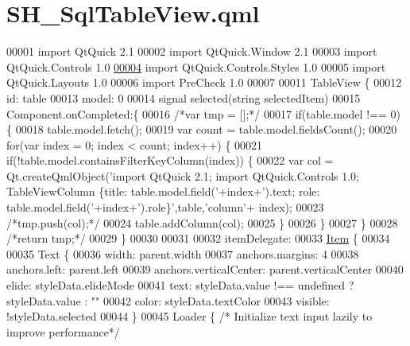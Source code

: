 \hypertarget{SH__SqlTableView_8qml}{\section{S\-H\-\_\-\-Sql\-Table\-View.\-qml}
\label{SH__SqlTableView_8qml}
}

\begin{DoxyCode}
00001 \textcolor{keyword}{import} QtQuick 2.1
00002 import QtQuick.Window 2.1
00003 import QtQuick.Controls 1.0
\hypertarget{SH__SqlTableView_8qml_source_l00004}{}\hyperlink{classSH__SqlTableView}{00004} import QtQuick.Controls.Styles 1.0
00005 import QtQuick.Layouts 1.0
00006 import PreCheck 1.0
00007 
00011 TableView \{
00012     \textcolor{keywordtype}{id}: table
00013     model: 0
00014     signal selected(\textcolor{keywordtype}{string} selectedItem)
00015     Component.onCompleted:\{
00016         \textcolor{comment}{/*var tmp = [];*/}
00017         \textcolor{keywordflow}{if}(table.model !== 0) \{
00018             table.model.fetch();
00019             var count = table.model.fieldsCount();
00020             \textcolor{keywordflow}{for}(var index = 0; index < count; index++) \{
00021                 \textcolor{keywordflow}{if}(!table.model.containsFilterKeyColumn(index)) \{
00022                     var col = Qt.createQmlObject(\textcolor{stringliteral}{'import QtQuick 2.1; import QtQuick.Controls 1.0;
       TableViewColumn \{title: table.model.field('}+index+\textcolor{stringliteral}{').text; role: table.model.field('}+index+\textcolor{stringliteral}{').role\}'},table,\textcolor{stringliteral}{'column'}+
      index);
00023                     \textcolor{comment}{/*tmp.push(col);*/}
00024                     table.addColumn(col);
00025                 \}
00026             \}
00027         \}
00028         \textcolor{comment}{/*return tmp;*/}
00029     \}
00030 
00031 
00032     itemDelegate:
00033         \hyperlink{classItem}{Item} \{
00034 
00035         Text \{
00036             width: parent.width
00037             anchors.margins: 4
00038             anchors.left: parent.left
00039             anchors.verticalCenter: parent.verticalCenter
00040             elide: styleData.elideMode
00041             text: styleData.value !== undefined ? styleData.value : \textcolor{stringliteral}{""}
00042             color: styleData.textColor
00043             visible: !styleData.selected
00044         \}
00045         Loader \{ \textcolor{comment}{/* Initialize text input lazily to improve performance*/}

\end{DoxyCode}
